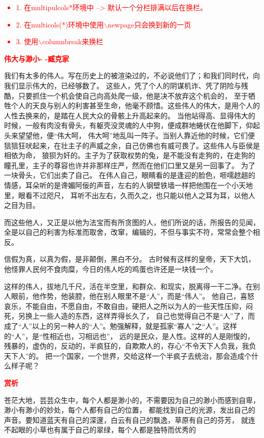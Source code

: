 \documentclass[fontset=windows, 12pt]{article}
\newcommand{\red}[1]{\textcolor{red}{#1}}
\begin{document}
{
    \red{
    \begin{itemize}
        \item 1. 在multipulcols*环境中 --> 默认一个分栏排满以后在换栏。
        \item 2. 在multicols(*)环境中使用$\backslash$newpage只会换到新的一页
        \item 3. 使用$\backslash$columnbreak来换栏
    \end{itemize} 
    }   
}
\par
\vspace*{4em}
\centerline{\red{\textbf{伟大与渺小- -臧克家}}}
\begin{multicols}{2}

我们有太多的伟人。写在历史上的被渲染过的，不必说他们了；和我们同时代，向我们显示伟大的，已经够数了。
这些人，凭了个人的阴谋机诈、凭了阴险与残酷，只要抓住一个机会使自己向高处爬一级，他是决不放弃这个机会的，
至于牺牲个人的天良与别人的利害甚至生命，他毫不顾惜。这些伟人的伟大，是用个人的人性去换来的，是踏在人民大众的骨骸上升高起来的。
当他站得高、显得伟大的时候，一般有肉没有骨头，有躯壳没灵魂的人中狗，便成群地蜷伏在他脚下，仰起头来望望他，便“伟大呵，
伟大呵”地乱叫一阵子。当别人靠近他的时候，它们便狺狺狂吠起来，在壮主子的声威之余，自己仿佛也有威可畏了。这些伟人与臣侯是相依为命，
狼狈为奸的。主子为了获取权势的兔，是不能没有走狗的，在走狗的瞳孔里，主子的尊容也许并非那样庄严，然而在他们口里又是另一回事了。
为了一块骨头，它们出卖了自己。
在伟人自己，眼睛看的是逢迎的脸色，咂嚅趑趄的情感，耳朵听的是谗媚阿佞的声音，左右的人钢壁铁墙一样把他围在一个小天地里，眼看不过咫尺，
耳听不出左右，久而久之，也只能以他人之耳为耳，以他人之目为目。
\columnbreak

而这些他人，又正是以他为法宝而有所贪图的人，他们所说的话，所报告的见闻，
全是以自己的利害为标准而取舍，改窜，编辑的，不但与事实不符，常常会整个相反。

信假为真，以真为假，是非颠倒，黑白不分。
古时候有这样的皇帝，天下大饥，他怪罪人民何不食肉糜，今日的伟人吃的鸡蛋也许还是一块钱一个。

这样的伟人，拔地几千尺，活在半空里，和群众、和现实，脱离得一干二净。在别人眼前，他作势，他装腔，他在别人眼里不是“人”，而是“伟人”。
他自己，喜怒哀乐，不能自由，不愿自由，不敢自由，硬把人之所以为人的一些天性压抑，闷死，另换上一些人造的东西，这样弄得长久了，
自己也觉得自己不是“人”了，而成了“人”以上的另一种人的“人”。勉强解释，就是孤家“寡人”之“人”。这样的“人”，是“性相近也，习相远也”，
远的是民众，是人性。这样的人是刚愎的，残暴的，虚伪的，反动的，半疯狂的，自欺欺人的，存心“不令天下人负我，我负天下人”的。
把一个国家，一个世界，交给这样一个半疯子去统治，那会造成个什么样子呢？

\end{multicols}
\red{\textbf{赏析}}\par
{
    \kaishu 
    苍茫大地，芸芸众生中，每个人都是渺小的，不需要因为自己的渺小而感到自卑，渺小有渺小的妙处，每个人都有自己的位置，
    都能找到自己的光源，发出自己的声音。要知道蓝天有自己的深邃，白云有自己的飘逸，草原有自己的芬芳，
    就连不起眼的小草也有属于自己的翠绿，每个人都是独特而优秀的
}
\end{document}
